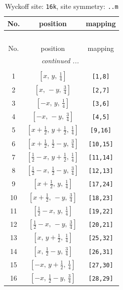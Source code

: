 \documentclass[fleqn,8pt]{jsarticle}
\begin{document}
\renewcommand{\arraystretch}{1.2}
\begin{longtable}{ccc}
\caption{Wyckoff site: {\tt 16k}, site symmetry: {\tt ..m}}
 \\
 \hline \hline
No. & position & mapping \\ \hline \endfirsthead

\multicolumn{2}{l}{\tablename\ \thetable{}} \\
 \hline \hline
No. & position & mapping \\ \hline \endhead

 \hline \hline
\multicolumn{2}{r}{\footnotesize\it continued ...} \\ \endfoot

 \hline \hline
\multicolumn{2}{r}{} \\ \endlastfoot

1 & $\left[ x,\, y,\, \frac{1}{4} \right]$ & {\tt [1,8]} \\ \hline
2 & $\left[ x,\, - y,\, \frac{3}{4} \right]$ & {\tt [2,7]} \\ \hline
3 & $\left[ - x,\, y,\, \frac{1}{4} \right]$ & {\tt [3,6]} \\ \hline
4 & $\left[ - x,\, - y,\, \frac{3}{4} \right]$ & {\tt [4,5]} \\ \hline
5 & $\left[ x + \frac{1}{2},\, y + \frac{1}{2},\, \frac{1}{4} \right]$ & {\tt [9,16]} \\ \hline
6 & $\left[ x + \frac{1}{2},\, \frac{1}{2} - y,\, \frac{3}{4} \right]$ & {\tt [10,15]} \\ \hline
7 & $\left[ \frac{1}{2} - x,\, y + \frac{1}{2},\, \frac{1}{4} \right]$ & {\tt [11,14]} \\ \hline
8 & $\left[ \frac{1}{2} - x,\, \frac{1}{2} - y,\, \frac{3}{4} \right]$ & {\tt [12,13]} \\ \hline
9 & $\left[ x + \frac{1}{2},\, y,\, \frac{1}{4} \right]$ & {\tt [17,24]} \\ \hline
10 & $\left[ x + \frac{1}{2},\, - y,\, \frac{3}{4} \right]$ & {\tt [18,23]} \\ \hline
11 & $\left[ \frac{1}{2} - x,\, y,\, \frac{1}{4} \right]$ & {\tt [19,22]} \\ \hline
12 & $\left[ \frac{1}{2} - x,\, - y,\, \frac{3}{4} \right]$ & {\tt [20,21]} \\ \hline
13 & $\left[ x,\, y + \frac{1}{2},\, \frac{1}{4} \right]$ & {\tt [25,32]} \\ \hline
14 & $\left[ x,\, \frac{1}{2} - y,\, \frac{3}{4} \right]$ & {\tt [26,31]} \\ \hline
15 & $\left[ - x,\, y + \frac{1}{2},\, \frac{1}{4} \right]$ & {\tt [27,30]} \\ \hline
16 & $\left[ - x,\, \frac{1}{2} - y,\, \frac{3}{4} \right]$ & {\tt [28,29]} \\
\end{longtable}
\end{document}

